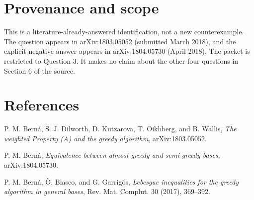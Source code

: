 \documentclass[11pt]{article}
\begin{document}
\section*{Provenance and scope}

This is a literature-already-answered identification, not a new
counterexample.  The question appears in arXiv:1803.05052 (submitted March
2018), and the explicit negative answer appears in arXiv:1804.05730 (April
2018).  The packet is restricted to Question 3.  It makes no claim about the
other four questions in Section 6 of the source.

\section*{References}

\begin{enumerate}[leftmargin=*,label={[\arabic*]}]
\item P. M. Bern\'a, S. J. Dilworth, D. Kutzarova, T. Oikhberg, and
  B. Wallis, \emph{The weighted Property (A) and the greedy algorithm},
  arXiv:1803.05052.
\item P. M. Bern\'a, \emph{Equivalence between almost-greedy and
  semi-greedy bases}, arXiv:1804.05730.
\item P. M. Bern\'a, \`O. Blasco, and G. Garrig\'os,
  \emph{Lebesgue inequalities for the greedy algorithm in general bases},
  Rev. Mat. Complut. 30 (2017), 369--392.
\end{enumerate}
\end{document}

